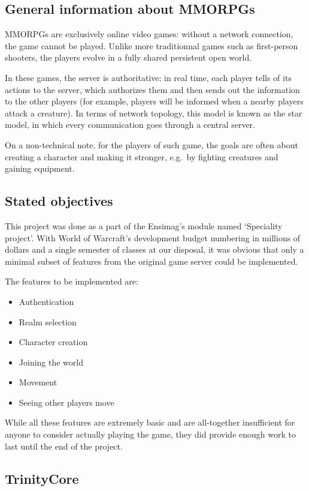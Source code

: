 \documentclass[paper=a4, fontsize=11pt]{scrartcl}
\begin{document}
\subsection{General information about MMORPGs}

MMORPGs are exclusively online video games: without a network connection, the
game cannot be played. Unlike more traditionnal games such as first-person
shooters, the players evolve in a fully shared persistent open world.

In these games, the server is authoritative: in real time, each player tells of
its actions to the server, which authorizes them and then sends out the
information to the other players (for example, players will be informed when a
nearby players attack a creature).
In terms of network topology, this model is known as the star model, in which
every communication goes through a central server.

On a non-technical note, for the players of such game, the goals are often about
creating a character and making it stronger, e.g.\ by fighting creatures and
gaining equipment.

\subsection{Stated objectives}

This project was done as a part of the Ensimag's module named `Speciality
project'.
With World of Warcraft's development budget numbering in millions of dollars and
a single semester of classes at our disposal, it was obvious that only a minimal
subset of features from the original game server could be implemented.\

The features to be implemented are:
\begin{itemize}
    \item Authentication
    \item Realm selection
    \item Character creation
    \item Joining the world
    \item Movement
    \item Seeing other players move
\end{itemize}

While all these features are extremely basic and are all-together insufficient
for anyone to consider actually playing the game, they did provide enough work
to last until the end of the project.

\subsection{TrinityCore}
\end{document}

